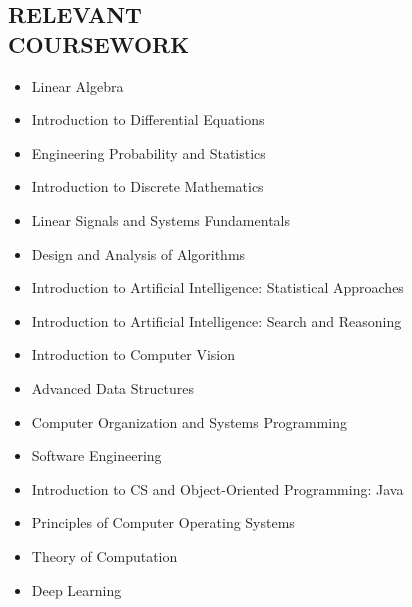 \documentclass[margin]{res}
\begin{document}
\begin{resume}
\section{RELEVANT\\COURSEWORK}
\small
\begin{multicols}{2}
    \begin{itemize}
        \item Linear Algebra
        \item Introduction to Differential Equations
        \item Engineering Probability and Statistics
        \item Introduction to Discrete Mathematics
        \item Linear Signals and Systems Fundamentals
        \item Design and Analysis of Algorithms
        \item Introduction to Artificial Intelligence: Statistical Approaches
        \item Introduction to Artificial Intelligence: Search and Reasoning
        \item Introduction to Computer Vision
        \item Advanced Data Structures
        \item Computer Organization and Systems Programming
        \item Software Engineering
        \item Introduction to CS and Object-Oriented Programming: Java
        \item Principles of Computer Operating Systems
        \item Theory of Computation
        \item Deep Learning
    \end{itemize}
\end{multicols}
\normalsize
%




\end{resume}
\end{document}

